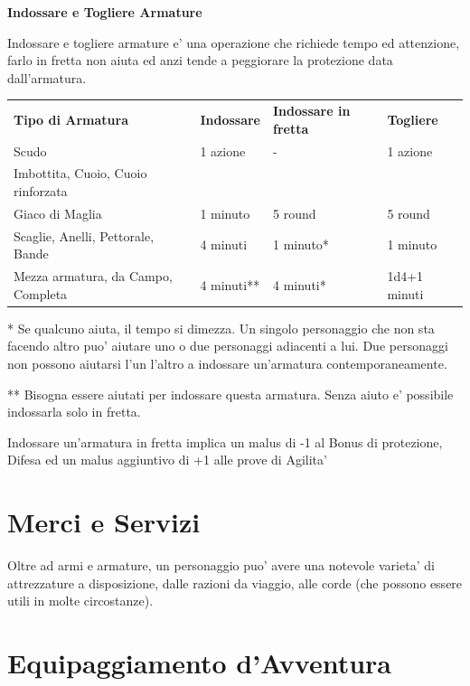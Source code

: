 \documentclass[a4paper,11pt,twoside,openany]{book}
\begin{document}
{\bigskip
\textbf{Indossare e Togliere Armature}
\bigskip

Indossare e togliere armature e' una operazione che richiede tempo ed attenzione, farlo in fretta non aiuta ed anzi tende a peggiorare la protezione data dall'armatura.

\bigskip

\begin{tabular}{llll}
\toprule
\textbf{Tipo di Armatura} & \textbf{Indossare} & \textbf{Indossare in fretta} & \textbf{Togliere}\tabularnewline
Scudo & 1 azione & - & 1 azione\tabularnewline
Imbottita, Cuoio, Cuoio rinforzata\\
Giaco di Maglia & 1 minuto & 5 round & 5 round\tabularnewline
Scaglie, Anelli, Pettorale, Bande & 4 minuti & 1 minuto{*} & 1 minuto\tabularnewline
Mezza armatura, da Campo, Completa & 4 minuti{*}{*} & 4 minuti{*} & 1d4+1 minuti\tabularnewline

\end{tabular}

\bigskip

{*} Se qualcuno aiuta, il tempo si dimezza. Un singolo personaggio che non sta facendo altro puo' aiutare uno o due personaggi adiacenti a lui. Due personaggi non possono aiutarsi l'un l'altro a indossare un'armatura contemporaneamente.

{*}{*} Bisogna essere aiutati per indossare questa armatura. Senza aiuto e' possibile indossarla solo in fretta.

Indossare un'armatura in fretta implica un malus di -1 al Bonus di protezione, Difesa ed un malus aggiuntivo di +1 alle prove di Agilita'

\pagebreak

\section{Merci e Servizi}

\label{merci-e-servizi}

Oltre ad armi e armature, un personaggio puo' avere una notevole varieta' di attrezzature a disposizione, dalle razioni da viaggio, alle corde (che possono essere utili in molte circostanze). 


\section{Equipaggiamento d'Avventura}\label{Equipaggiamento}

\label{equipaggiamento-davventura}


}
\end{document}
